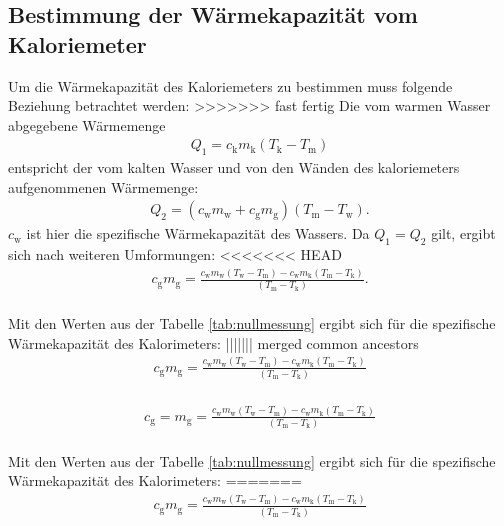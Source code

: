 \subsection{Bestimmung der Wärmekapazität vom Kaloriemeter}
Um die Wärmekapazität des Kaloriemeters zu bestimmen muss folgende Beziehung betrachtet werden:
>>>>>>> fast fertig
Die vom warmen Wasser abgegebene Wärmemenge
\begin{align}
Q_\mathrm{1}=c_\mathrm{k} m_\mathrm{k}(T_\mathrm{k}-T_\mathrm{m})
\end{align}
entspricht der vom kalten Wasser und von den Wänden des kaloriemeters aufgenommenen Wärmemenge:
\begin{align}
Q_\mathrm{2}=(c_\mathrm{w} m_\mathrm{w} + c_\mathrm{g} m_\mathrm{g}) (T_\mathrm{m}-T_\mathrm{w}).
\end{align}
$c_\mathrm{w}$ ist hier die spezifische Wärmekapazität des Wassers.
Da $Q_\mathrm {1}=Q_\mathrm{2}$ gilt, ergibt sich nach weiteren Umformungen:
<<<<<<< HEAD
\begin{align*}
c_\mathrm{g}m_\mathrm{g}=\frac{c_\mathrm{w} m_\mathrm{w}(T_\mathrm{w}-T_\mathrm{m})-c_\mathrm{w} m_\mathrm{k}(T_\mathrm{m}-T_\mathrm{k})}{(T_\mathrm{m}-T_\mathrm{k})}.
\end{align*}\\
Mit den Werten aus der Tabelle \ref{tab:nullmessung} ergibt sich für die spezifische Wärmekapazität des Kalorimeters:
||||||| merged common ancestors
\begin{align}
c_\mathrm{g} m_\mathrm{g}=\frac{c_\mathrm{w} m_\mathrm{w}(T_\mathrm{w}-T_\mathrm{m})-c_\mathrm{w} m_\mathrm{k}(T_\mathrm{m}-T_\mathrm{k})}{(T_\mathrm{m}-T_\mathrm{k})}
\end{align}\\
\begin{align*}
c_\mathrm{g}=
m_\mathrm{g}=\frac{c_\mathrm{w} m_\mathrm{w}(T_\mathrm{w}-T_\mathrm{m})-c_\mathrm{w} m_\mathrm{k}(T_\mathrm{m}-T_\mathrm{k})}{(T_\mathrm{m}-T_\mathrm{k})}
\end{align*}\\
Mit den Werten aus der Tabelle \ref{tab:nullmessung} ergibt sich für die spezifische Wärmekapazität des Kalorimeters:
=======
\begin{align}
c_\mathrm{g} m_\mathrm{g}=\frac{c_\mathrm{w} m_\mathrm{w}(T_\mathrm{w}-T_\mathrm{m})-c_\mathrm{w} m_\mathrm{k}(T_\mathrm{m}-T_\mathrm{k})}{(T_\mathrm{m}-T_\mathrm{k})}
\end{align}\\
